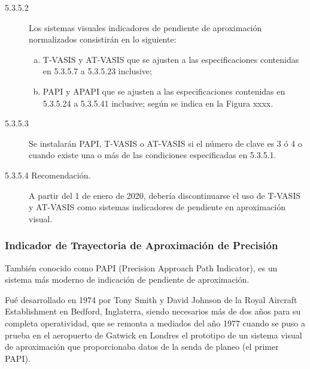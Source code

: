 \begin{tcolorbox}[title={OACI, Anexo 14. Volumen I. Edición 2018.} ]

  \begin{description}
  \item[5.3.5.2] Los sistemas visuales indicadores de pendiente de aproximación normalizados consistirán en lo siguiente:
    \begin{enumerate}[a)]
    \item  T-VASIS y AT-VASIS que se ajusten a las especificaciones
      contenidas en 5.3.5.7 a 5.3.5.23 inclusive; 
    \item  PAPI y APAPI que  se ajusten a las especificaciones contenidas en 5.3.5.24 a
      5.3.5.41 inclusive; según se indica en la Figura xxxx.
\end{enumerate}
\item[5.3.5.3] Se instalarán PAPI, T-VASIS o AT-VASIS si el número de clave es 3 ó 4 o cuando existe una o más de las
condiciones especificadas en 5.3.5.1. 
  \end{description}

\end{tcolorbox}  

\begin{tcolorbox}[colback=red!5!white, colframe=red!75!black,fonttitle=\bfseries,
  title={OACI, Anexo 14. Volumen I. Edición 2018.}]
  \begin{description}
  \item [5.3.5.4 Recomendación.] A partir del 1 de enero de 2020,
    debería discontinuarse el uso de T-VASIS y AT-VASIS como sistemas
    indicadores de pendiente en aproximación visual.
\end{description}

\end{tcolorbox}


\subsubsection{Indicador de Trayectoria de Aproximación de Precisión}
\label{sec:06.02.03.PAPI}

También conocido como PAPI (Precision Approach Path Indicator), es un sistema más moderno de indicación
de pendiente de aproximación.

Fué desarrollado en 1974 por Tony Smith y David Johnson de la Royal Aircraft Establishment en Bedford, Inglaterra,
siendo necesarios más de dos años para su completa operatividad, que se remonta a mediados del año 1977
cuando se puso a prueba en el aeropuerto de Gatwick en Londres el prototipo de un sistema visual de aproximación
que proporcionaba datos de la senda de planeo (el primer PAPI).

